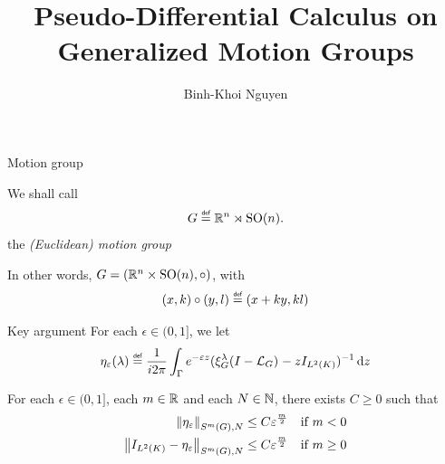 \documentclass{beamer}
\title{Pseudo-Differential Calculus on Generalized Motion Groups}
\author{Binh-Khoi Nguyen}
\begin{document}
\maketitle

\begin{frame}{Motion group}
    \begin{definition}
        We shall call
        \begin{align*}
            \Group \defeq \R^n \rtimes \SpecialOrthogonalGroup n.
        \end{align*}
        the \emph{(Euclidean) motion group}
    \end{definition}

    \pause

    In other words, $G = (\R^n \times \SpecialOrthogonalGroup n, \circ)$,
    with
    \begin{align*}
        (x, k) \circ (y, l) \defeq (x + k y, k l)
    \end{align*}
\end{frame}

\begin{frame}{Key argument}
    For each $\epsilon \in (0, 1]$,
    we let
    \begin{align*}
        \eta_\epsilon(\lambda)
        \defeq
        \frac 1 {\i \turn}
        \int_\Gamma
        \e^{-\epsilon z}
        (\Rep \lambda \BesselPotentialSquared {} - z \Id {\Lebesgue 2 \CompactGroup})^{-1}
        \dd z
    \end{align*}

    \pause

    \begin{theorem}
        For each $\epsilon \in (0, 1]$, each $m \in \R$ and each $N \in \N$,
        there exists $C \geq 0$ such that
        \begin{align*}
                \SymbolSemiNorm m {} N {\eta_\epsilon}
                &\leq C \epsilon^\frac m 2
                & \text{if } m < 0\\
                \SymbolSemiNorm m {} N {\Id {\Lebesgue 2 \CompactGroup} - \eta_\epsilon}
                &\leq C \epsilon^\frac m 2
                & \text{if } m \geq 0
        \end{align*}
    \end{theorem}
\end{frame}
\end{document}

